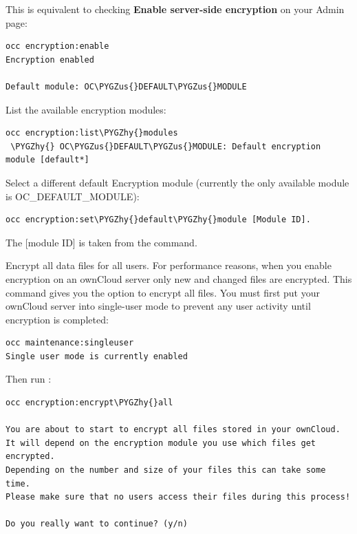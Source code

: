 \documentclass[letterpaper,10pt,english]{sphinxmanual}
\def\PYGZus{\char`\_}
\def\PYGZhy{\char`\-}
\begin{document}
This is equivalent to checking \textbf{Enable server-side encryption} on your Admin
page:

\begin{Verbatim}[commandchars=\\\{\}]
occ encryption:enable
Encryption enabled

Default module: OC\PYGZus{}DEFAULT\PYGZus{}MODULE
\end{Verbatim}

List the available encryption modules:

\begin{Verbatim}[commandchars=\\\{\}]
occ encryption:list\PYGZhy{}modules
 \PYGZhy{} OC\PYGZus{}DEFAULT\PYGZus{}MODULE: Default encryption module [default*]
\end{Verbatim}

Select a different default Encryption module (currently the only available
module is OC\_DEFAULT\_MODULE):

\begin{Verbatim}[commandchars=\\\{\}]
occ encryption:set\PYGZhy{}default\PYGZhy{}module [Module ID].
\end{Verbatim}

The {[}module ID{]} is taken from the  command.

Encrypt all data files for all users. For performance reasons, when you enable
encryption on an ownCloud server only new and changed files are encrypted. This
command gives you the option to encrypt all files. You must first put your
ownCloud server into single-user mode to prevent any user activity until
encryption is completed:

\begin{Verbatim}[commandchars=\\\{\}]
occ maintenance:singleuser
Single user mode is currently enabled
\end{Verbatim}

Then run :

\begin{Verbatim}[commandchars=\\\{\}]
occ encryption:encrypt\PYGZhy{}all

You are about to start to encrypt all files stored in your ownCloud.
It will depend on the encryption module you use which files get encrypted.
Depending on the number and size of your files this can take some time.
Please make sure that no users access their files during this process!

Do you really want to continue? (y/n)
\end{Verbatim}
\end{document}
